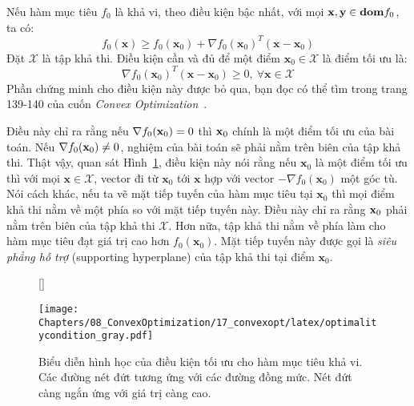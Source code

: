 Nếu hàm mục tiêu $f_0$ là khả vi, theo điều kiện bậc nhất, với mọi
$\mathbf{x}, \mathbf{y} \in \boldsymbol{\mathbf{dom}} f_0$, ta có:
\begin{equation}
f_0(\mathbf{x}) \geq f_0(\mathbf{x}_0) + \nabla f_0(\mathbf{x}_0)^T (\mathbf{x} - \mathbf{x}_0)
\end{equation}
Đặt $\mathcal{X}$ là tập khả thi. {Điều kiện cần và đủ} để một điểm $\mathbf{x}_0 \in \mathcal{X}$ là điểm tối ưu là:
\begin{equation}
\nabla f_0(\mathbf{x}_0)^T(\mathbf{x} - \mathbf{x}_0) \geq 0, ~\forall \mathbf{x} \in \mathcal{X}
\end{equation}
Phần chứng minh cho điều kiện này được bỏ qua, bạn đọc có thể tìm trong trang
139-140 của cuốn \textit{Convex Optimization}~\cite{boyd2004convex}.


Điều này chỉ ra rằng nếu $\nabla f_0(\mathbf{x}_0) = 0$ thì $\mathbf{x}_0$ chính là một điểm
tối ưu của bài toán. Nếu $\nabla f_0(\mathbf{x}_0) \neq 0$, nghiệm của bài toán sẽ
phải nằm trên biên của tập khả thi. Thật vậy, quan sát
Hình~\ref{fig:17_optimalitycondition}, điều kiện này nói rằng nếu $\mathbf{x}_0$
là một điểm tối ưu thì với mọi $\mathbf{x} \in \mathcal{X}$, vector đi từ
$\mathbf{x}_0$ tới $\mathbf{x}$ hợp với vector $-\nabla f_0 (\mathbf{x}_0)$ một
góc tù. Nói cách khác, nếu ta vẽ {mặt tiếp tuyến} của hàm mục tiêu tại
$\mathbf{x}_0$ thì mọi điểm {khả thi} nằm về một phía so với {mặt tiếp tuyến
này}. Điều này chỉ ra rằng $\mathbf{x}_0$ phải nằm trên biên của tập khả thi
$\mathcal{X}$. Hơn nữa, tập khả thi nằm về phía làm cho hàm mục tiêu đạt giá
trị cao
hơn $f_0(\mathbf{x}_0)$. Mặt tiếp tuyến này được gọi là \textit{siêu phẳng hỗ trợ} ({supporting hyperplane}) của tập khả thi tại điểm $\mathbf{x}_0$.

\begin{figure}[t]    %
[\FBwidth]
{\caption{Biểu diễn hình học của điều kiện tối ưu cho hàm mục tiêu khả vi.
Các đường nét đứt tương ứng với các đường đồng mức. Nét đứt càng ngắn ứng với giá trị càng cao.}
\label{fig:17_optimalitycondition}}
{\texttt{[image: Chapters/08\_ConvexOptimization/17\_convexopt/latex/optimalitycondition\_gray.pdf]}}
\end{figure}

